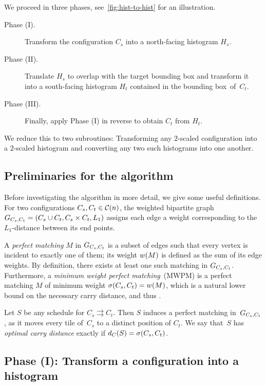 We proceed in three phases, see~\cref{fig:hist-to-hist} for an illustration.
\begin{description}
     \item[Phase (I).] {%
        Transform the configuration $C_s$ into a north-facing histogram $H_s$.
    }
    \item[Phase (II).] {%
        Translate $H_s$ to overlap with the target bounding box and transform it into a south-facing histogram $H_t$ contained in the bounding box~of~$C_t$.
    }
    \item[Phase (III).] Finally, apply Phase (I) in reverse to obtain $C_t$ from $H_t$.
\end{description}
We reduce this to two subroutines:
Transforming any $2$\nobreakdash-scaled configuration into a $2$\nobreakdash-scaled histogram and converting any two such histograms into one another.

\subsection{Preliminaries for the algorithm}
\label{subsec:preliminaries-algorithm}
Before investigating the algorithm in more detail, we give some useful definitions.
For two configurations $C_s, C_t \in \mathcal{C}(n)$, the weighted bipartite graph $G_{C_s, C_t}=({C_s \cup C_t}, {C_s \times C_t}, L_1)$ assigns each edge a weight corresponding to the $L_1$-distance between its end points.

A \emph{perfect matching} $M$ in $G_{C_s, C_t}$ is a subset of edges such that every vertex is incident to exactly one of them;
its weight $w(M)$ is defined as the sum of its edge weights.
By definition, there exists at least one such matching in $G_{C_s, C_t}$.
Furthermore, a \emph{minimum weight perfect matching}~(MWPM) is a perfect matching $M$ of minimum weight $\sigma(C_s,C_t)=w(M)$, which is a natural lower bound on the necessary carry distance, and thus \OPT.

Let $S$ be any schedule for ${C_s\rightrightarrows C_t}$.
Then $S$ induces a perfect matching in~$G_{C_s, C_t}$, as it moves every tile of~$C_s$ to a distinct position of $C_t$.
We say that~$S$ has \emph{optimal carry distance} exactly if $d_C(S)=\sigma(C_s,C_t)$.

\subsection{Phase (I): Transform a configuration into a histogram}
\label{subsec:building-a-histogram}

